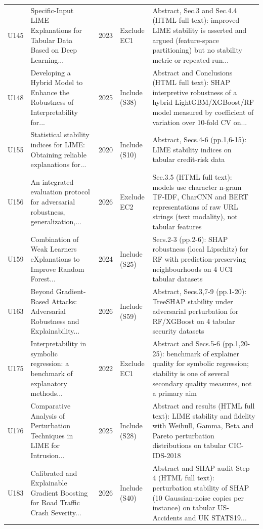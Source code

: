 \begin{longtable}{@{}P{1.0cm}P{6.3cm}P{0.7cm}P{1.6cm}P{6.1cm}@{}}
U145 & Specific-Input LIME Explanations for Tabular Data Based on Deep Learning... & 2023 & Exclude EC1 & Abstract, Sec.3 and Sec.4.4 (HTML full text): improved LIME stability is asserted and argued (feature-space partitioning) but no stability metric or repeated-run... \\
U148 & Developing a Hybrid Model to Enhance the Robustness of Interpretability for... & 2025 & Include (S38) & Abstract and Conclusions (HTML full text): SHAP interpretive robustness of a hybrid LightGBM/\allowbreak{}XGBoost/\allowbreak{}RF model measured by coefficient of variation over 10-fold CV on... \\
U155 & Statistical stability indices for LIME: Obtaining reliable explanations for... & 2020 & Include (S10) & Abstract, Secs.4-6 (pp.1,6-15): LIME stability indices on tabular credit-risk data \\
U156 & An integrated evaluation protocol for adversarial robustness, generalization,... & 2026 & Exclude EC2 & Sec.3.5 (HTML full text): models use character n-gram TF-IDF, CharCNN and BERT representations of raw URL strings (text modality), not tabular features \\
U159 & Combination of Weak Learners eXplanations to Improve Random Forest... & 2024 & Include (S25) & Secs.2-3 (pp.2-6): SHAP robustness (local Lipschitz) for RF with prediction-preserving neighbourhoods on 4 UCI tabular datasets \\
U163 & Beyond Gradient-Based Attacks: Adversarial Robustness and Explainability... & 2026 & Include (S59) & Abstract, Secs.3,7-9 (pp.1-20): TreeSHAP stability under adversarial perturbation for RF/\allowbreak{}XGBoost on 4 tabular security datasets \\
U175 & Interpretability in symbolic regression: a benchmark of explanatory methods... & 2022 & Exclude EC1 & Abstract and Secs.5-6 (pp.1,20-25): benchmark of explainer quality for symbolic regression; stability is one of several secondary quality measures, not a primary aim \\
U176 & Comparative Analysis of Perturbation Techniques in LIME for Intrusion... & 2025 & Include (S28) & Abstract and results (HTML full text): LIME stability and fidelity with Weibull, Gamma, Beta and Pareto perturbation distributions on tabular CIC-IDS-2018 \\
U183 & Calibrated and Explainable Gradient Boosting for Road Traffic Crash Severity... & 2026 & Include (S40) & Abstract and SHAP audit Step 4 (HTML full text): perturbation stability of SHAP (10 Gaussian-noise copies per instance) on tabular US-Accidents and UK STATS19... \\

\end{longtable}
